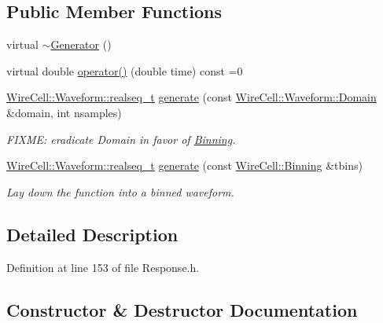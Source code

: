 \subsection*{Public Member Functions}
\begin{DoxyCompactItemize}
\item 
virtual \hyperlink{class_wire_cell_1_1_response_1_1_generator_ad9bcb3eefdb95af170a2f546b4e46bcf}{$\sim$\+Generator} ()
\item 
virtual double \hyperlink{class_wire_cell_1_1_response_1_1_generator_a216d7f7bd22a1a781b6b00bd988e0136}{operator()} (double time) const =0
\item 
\hyperlink{namespace_wire_cell_1_1_waveform_a479175e541c8545e87cd8063b74b6956}{Wire\+Cell\+::\+Waveform\+::realseq\+\_\+t} \hyperlink{class_wire_cell_1_1_response_1_1_generator_aceed932e0bab5af1cb80981507667e5e}{generate} (const \hyperlink{namespace_wire_cell_1_1_waveform_aa783b1c2a84242349d5c798b7483727b}{Wire\+Cell\+::\+Waveform\+::\+Domain} \&domain, int nsamples)
\begin{DoxyCompactList}\small\item\em F\+I\+X\+ME\+: eradicate Domain in favor of \hyperlink{class_wire_cell_1_1_binning}{Binning}. \end{DoxyCompactList}\item 
\hyperlink{namespace_wire_cell_1_1_waveform_a479175e541c8545e87cd8063b74b6956}{Wire\+Cell\+::\+Waveform\+::realseq\+\_\+t} \hyperlink{class_wire_cell_1_1_response_1_1_generator_a571c13c36686dc25f987b0c189a6ce92}{generate} (const \hyperlink{class_wire_cell_1_1_binning}{Wire\+Cell\+::\+Binning} \&tbins)
\begin{DoxyCompactList}\small\item\em Lay down the function into a binned waveform. \end{DoxyCompactList}\end{DoxyCompactItemize}


\subsection{Detailed Description}


Definition at line 153 of file Response.\+h.



\subsection{Constructor \& Destructor Documentation}
\mbox{\label{class_wire_cell_1_1_response_1_1_generator_ad9bcb3eefdb95af170a2f546b4e46bcf}} 
